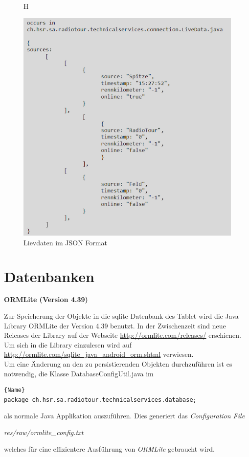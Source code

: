 \begin{figure}{H}
\caption{Lievdaten im JSON Format }
\label{fig:jsonreceive}
\centering
\includegraphics[scale=0.9]{05bericht/images/json2.png}
\end{figure}

\section{Datenbanken}
\textbf{ORMLite (Version 4.39)}

 
Zur Speicherung der Objekte in die \gls{sqlite} Datenbank des Tablet wird die Java Library ORMLite der Version 4.39 benutzt. In der Zwischenzeit sind neue Releases der Library auf der Webseite \url{http://ormlite.com/releases/} erschienen. Um sich in die Library einzulesen wird auf \url{http://ormlite.com/sqlite_java_android_orm.shtml} verwiesen.
\\
Um eine Änderung an den zu persistierenden Objekten durchzuführen ist es notwendig, die Klasse DatabaseConfigUtil.java im

\begin{lstlisting}{Name}
package ch.hsr.sa.radiotour.technicalservices.database;
\end{lstlisting}

als normale Java Applikation auszuführen. Dies generiert das \textit{Configuration File}

\textit{res/raw/ormlite\_config.txt}

welches für eine effizientere Ausführung von \textit{ORMLite} gebraucht wird.



